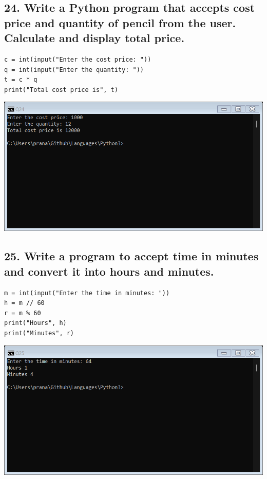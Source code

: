 \documentclass[12pt]{article}
\begin{document}
\subsection*{24. Write a Python program that accepts cost price and quantity of pencil from the user. Calculate and display total price.}
\begin{verbatim}
c = int(input("Enter the cost price: "))
q = int(input("Enter the quantity: "))
t = c * q
print("Total cost price is", t)
\end{verbatim}
\includegraphics[width=\linewidth]{images/24.png}

\subsection*{25. Write a program to accept time in minutes and convert it into hours and minutes.}
\begin{verbatim}
m = int(input("Enter the time in minutes: "))
h = m // 60
r = m % 60
print("Hours", h)
print("Minutes", r)
\end{verbatim}
\includegraphics[width=\linewidth]{images/25.png}
\end{document}
